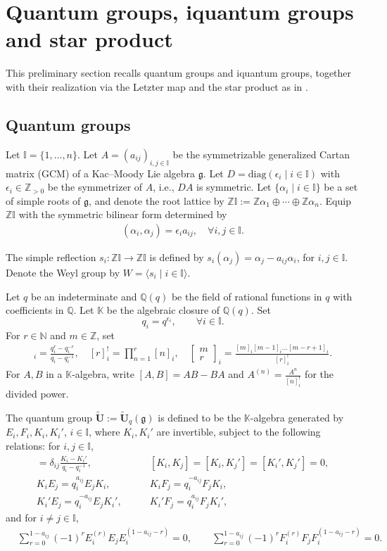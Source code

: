 \documentclass[a4paper,reqno,12pt]{amsart}
\numberwithin{equation}{section}
\theoremstyle{definition}
\theoremstyle{plain}
\theoremstyle{definition}
\def\fg{\mathfrak g}
\def\Q{\mathbb Q}
\def\K{\mathbb K}
\def\N{\mathbb N}
\def\Z{\mathbb Z}
\def\I{\mathbb I}
\def\tU{\widetilde{\mathbf U}}
\newcommand{\diag}{\mathrm{diag}}
\newcommand{\qbinom}[2]{\begin{bmatrix} #1\\#2 \end{bmatrix} }
\begin{document}
\section{Quantum groups, iquantum groups and star product}
\label{sec:QG-iQG}
This preliminary section recalls quantum groups and iquantum groups, together with their realization via the Letzter map and the star product as in \cite{KY21,KY26}.
\subsection{Quantum groups}
Let $\I=\{1,\dots,n\}$. 
	Let $A=(a_{ij})_{i,j \in \I}$ be the symmetrizable generalized Cartan matrix (GCM) of a Kac--Moody Lie algebra $\fg$. Let $D=\diag(\epsilon_i\mid i\in \I)$ with $\epsilon_i\in\Z_{>0}$ be the symmetrizer of $A$, i.e., $DA$ is symmetric. 
	Let $\{\alpha_i\mid i\in\I\}$ be a set of simple roots of $\fg$, and denote the root lattice by $\Z{\I}:=\Z\alpha_1\oplus\cdots\oplus\Z\alpha_n$. Equip $\Z\I$ with the symmetric bilinear form determined by
	\begin{align} \label{BilForm}
		(\alpha_i,\alpha_j)=\epsilon_ia_{ij},\quad \forall i,j\in\I.
	\end{align}
	
	The simple reflection $s_i:\Z{\I}\rightarrow\Z{\I}$ is defined by $s_i(\alpha_j)=\alpha_j-a_{ij}\alpha_i$, for $i,j\in \I$.
	Denote the Weyl group by $W =\langle s_i\mid i\in \I\rangle$.
	
	Let $q$ be an indeterminate and $\Q(q)$  be the field of rational functions in $q$ with coefficients in $\Q$. Let $\K$ be the algebraic closure of $\Q(q)$. Set 
	$$q_i=q^{\epsilon_i},\qquad \forall i\in\I.$$
    For $r\in\N$ and $m \in \Z$, set
	\begin{align*}
	  [r]_{i}=\frac{q_i^r-q_i^{-r}}{q_i-q_i^{-1}},
	\quad
	[r]_{i}^!=\prod_{n=1}^r [n]_{i}, \quad \qbinom{m}{r}_{i} =\frac{[m]_{i}[m-1]_{i}\ldots [m-r+1]_{i}}{[r]_{i}^!}.  
	\end{align*}
    For $A,B$ in a $\K$-algebra, write $[A, B]=AB-BA$ and $A^{(n)}=\frac{A^n}{[n]_i^!}$ for the divided power.
	
	The quantum group $\tU := \tU_q(\fg)$ is defined to be the $\K$-algebra generated by $E_i,F_i, K_i,K_i'$, $i\in \I$, where $K_i,K_i'$ are invertible, subject to the following relations:  for $i, j \in \I$,
	\begin{align}
		[E_i,F_j]= \delta_{ij}\frac{K_i-K_i'}{q_i-q_i^{-1}},  &\qquad [K_i,K_j]=[K_i,K_j']  =[K_i',K_j']=0,
		\label{eq:KK}
		\\
		K_i E_j=q_i^{a_{ij}} E_j K_i, & \qquad K_i F_j=q_i^{-a_{ij}} F_j K_i,
		\label{eq:EK}
		\\
		K_i' E_j=q_i^{-a_{ij}} E_j K_i', & \qquad K_i' F_j=q_i^{a_{ij}} F_j K_i',
		\label{eq:K2}
	\end{align}
	and for $i\neq j \in \I$,
	\begin{align}
		& \sum_{r=0}^{1-a_{ij}} (-1)^r   E_i^{(r)} E_j  E_i^{(1-a_{ij}-r)}=0,\qquad \sum_{r=0}^{1-a_{ij}} (-1)^r   F_i^{(r)} F_j  F_i^{(1-a_{ij}-r)}=0.
		\label{eq:serre}
	\end{align}
	
\end{document}
